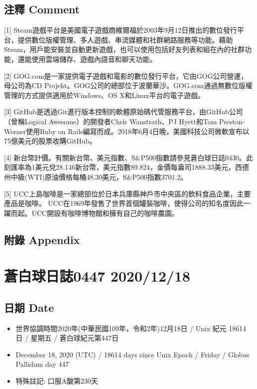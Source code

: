 \documentclass[a5paper, 11pt
]{book}
\providecommand{\tightlist}{%
  \setlength{\itemsep}{0pt}\setlength{\parskip}{0pt}}
\begin{document}
\hypertarget{ux6ce8ux91cb-comment-16}{%
\subsection{注釋 Comment}\label{ux6ce8ux91cb-comment-16}}

{[}1{]}
Steam遊戲平台是美國電子遊戲商維爾福於2003年9月12日推出的數位發行平台，提供數位版權管理、多人遊戲、串流媒體和社群網路服務等功能。藉助Steam，用戶能安裝並自動更新遊戲，也可以使用包括好友列表和組在內的社群功能，還能使用雲端儲存、遊戲內語音和聊天功能。

{[}2{]}
GOG.com是一家提供電子遊戲和電影的數位發行平台，它由GOG公司營運，母公司為CD
Projekt。GOG公司的總部位于波蘭華沙。GOG.com通過無數位版權管理的方式提供適用於Windows、OS
X和Linux平台的電子遊戲。

{[}3{]}
GitHub是透過Git進行版本控制的軟體原始碼代管服務平台，由GitHub公司（曾稱Logical
Awesome）的開發者Chris Wanstrath、PJ Hyett和Tom Preston-Werner使用Ruby
on
Rails編寫而成。2018年6月4日晚，美國科技公司微軟宣布以75億美元的股票收購GitHub。

{[}4{]}
新台幣計價。有關新台幣、美元指數、S\&P500指數請參見蒼白球日誌0430。此刻匯率為1美元兌28.146新台幣，美元指數89.824，金價每盎司1888.33美元，西德州中級(WTI)原油價格每桶48.30美元，S\&P500指數3701.2。

{[}5{]}
UCC上島咖啡是一家總部位於日本兵庫縣神戶市中央區的飲料食品企業，主要產品是咖啡。
UCC在1969年發售了世界首個罐裝咖啡，使得公司的知名度因此一躍而起。UCC開設有咖啡博物館和擁有自己的咖啡農園。

\hypertarget{ux9644ux9304-appendix-16}{%
\subsection{附錄 Appendix}\label{ux9644ux9304-appendix-16}}

\hypertarget{ux84bcux767dux7403ux65e5ux8a8c0447-20201218}{%
\section{蒼白球日誌0447
2020/12/18}\label{ux84bcux767dux7403ux65e5ux8a8c0447-20201218}}

\hypertarget{ux65e5ux671f-date-17}{%
\subsection{日期 Date}\label{ux65e5ux671f-date-17}}

\begin{itemize}
\tightlist
\item
  世界協調時間2020年(中華民國109年，令和2年)12月18日 / Unix 紀元 18614
  日 / 星期五 / 蒼白球紀元第447日
\item
  December 18, 2020 (UTC) / 18614 days since Unix Epoch / Friday /
  Globus Pallidum day 447
\item
  特殊註記: 口服A酸第230天
\end{itemize}
\end{document}
